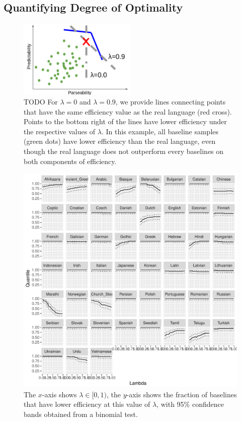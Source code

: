 \documentclass[10pt,twoside,lineno]{article}
\begin{document}
\subsection{Quantifying Degree of Optimality}


\begin{figure}
\centering
		\includegraphics[width=0.5\textwidth]{lambda-explanation.png}

	\caption{TODO For $\lambda=0$ and $\lambda=0.9$, we provide lines connecting points that have the same efficiency value as the real language (red cross). Points to the bottom right of the lines have lower efficiency under the respective values of $\lambda$. In this example, all baseline samples (green dots) have lower efficiency than the real language, even though the real language does not outperform every baselines on both components of efficiency.}\label{fig:opt-lambda-explanation}
\end{figure}


\begin{figure}
\centering
\includegraphics[width=\textwidth]{../results/plane/analyze_pareto_optimality/figures/quantileByLambda.pdf}
	\caption[]{The $x$-axis shows $\lambda \in [0,1)$, the $y$-axis shows the fraction of baselines that have lower efficiency at this value of $\lambda$, with 95\% confidence bands obtained from a binomial test.}\label{fig:lambda-quantile}
\end{figure}
\end{document}

